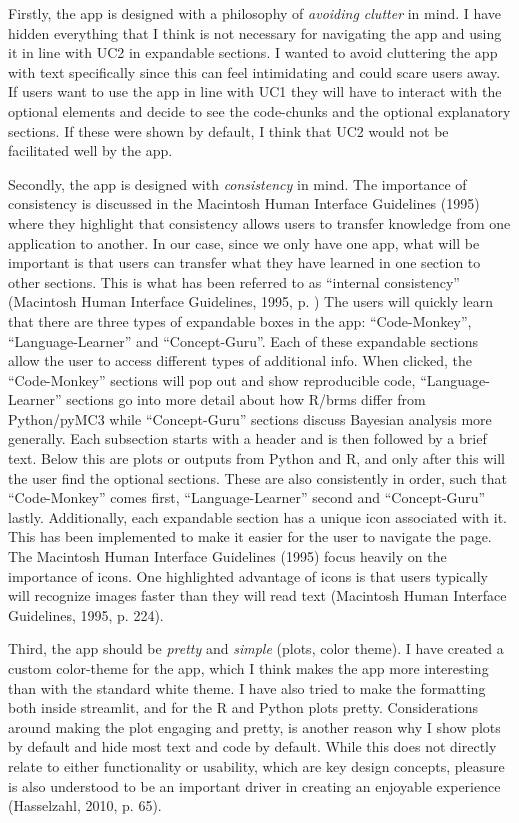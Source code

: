 \documentclass[12pt]{article}
\begin{document}
Firstly, the app is designed with a philosophy of \emph{avoiding clutter} in mind.
I have hidden everything that I think is not necessary for navigating the app and
using it in line with UC2 in expandable sections. I wanted to avoid cluttering the
app with text specifically since this can feel intimidating and could scare users away.
If users want to use the app in line with UC1 they will have to interact with the optional
elements and decide to see the code-chunks and the optional explanatory sections.
If these were shown by default, I think that UC2 would not be facilitated well by the app.

Secondly, the app is designed with \emph{consistency} in mind.
The importance of consistency is discussed in the Macintosh Human Interface Guidelines (1995)
where they highlight that consistency allows users to transfer knowledge from one
application to another. In our case, since we only have one app, what will be important is
that users can transfer what they have learned in one section to other sections.
This is what has been referred to as “internal consistency” (Macintosh Human Interface Guidelines, 1995, p. )
The users will quickly learn that there are three types of expandable boxes in the app:
“Code-Monkey”, “Language-Learner” and “Concept-Guru”. Each of these expandable sections
allow the user to access different types of additional info. When clicked, the “Code-Monkey”
sections will pop out and show reproducible code, “Language-Learner” sections go into more detail
about how R/brms differ from Python/pyMC3 while “Concept-Guru” sections discuss Bayesian analysis
more generally. Each subsection starts with a header and is then followed by a brief text.
Below this are plots or outputs from Python and R, and only after this will the user find
the optional sections. These are also consistently in order, such that “Code-Monkey” comes first,
“Language-Learner” second and “Concept-Guru” lastly. Additionally, each expandable section
has a unique icon associated with it. This has been implemented to make it easier for the
user to navigate the page. The Macintosh Human Interface Guidelines (1995) focus
heavily on the importance of icons. One highlighted advantage of icons is that users typically
will recognize images faster than they will read
text (Macintosh Human Interface Guidelines, 1995, p. 224).

Third, the app should be \emph{pretty} and \emph{simple} (plots, color theme).
I have created a custom color-theme for the app, which I think makes the app more interesting
than with the standard white theme. I have also tried to make the formatting both inside
streamlit, and for the R and Python plots pretty. Considerations around making the plot engaging
and pretty, is another reason why I show plots by default and hide most text and code by default.
While this does not directly relate to either functionality or usability,
which are key design concepts, pleasure is also understood to be an important driver
in creating an enjoyable experience (Hasselzahl, 2010, p. 65).
\end{document}
